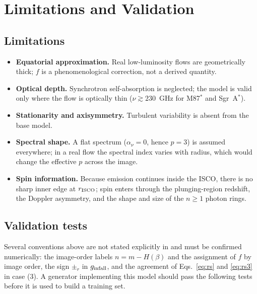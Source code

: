 \documentclass[11pt]{article}
\begin{document}
\section{Limitations and Validation}

\subsection{Limitations}

\begin{itemize}
  \item \textbf{Equatorial approximation.} Real low-luminosity flows are
        geometrically thick; $f$ is a phenomenological correction, not a
        derived quantity.
  \item \textbf{Optical depth.} Synchrotron self-absorption is neglected; the
        model is valid only where the flow is optically thin
        ($\nu \gtrsim 230$~GHz for M87$^*$ and Sgr~A$^*$).
  \item \textbf{Stationarity and axisymmetry.} Turbulent variability is
        absent from the base model.
  \item \textbf{Spectral shape.} A flat spectrum ($\alpha_\nu = 0$, hence
        $p = 3$) is assumed everywhere; in a real flow the spectral index
        varies with radius, which would change the effective $p$ across the
        image.
  \item \textbf{Spin information.} Because emission continues inside the ISCO,
        there is no sharp inner edge at $r_{\rm ISCO}$; spin enters through
        the plunging-region redshift, the Doppler asymmetry, and the shape and
        size of the $n \ge 1$ photon rings.
\end{itemize}

\subsection{Validation tests}

Several conventions above are not stated explicitly in \cite{GLM2020} and
must be confirmed numerically: the image-order labels $n = m - H(\beta)$ and
the assignment of $f$ by image order, the sign $\pm_r$ in $g_{\rm infall}$,
and the agreement of Eqs.~\eqref{eq:rs} and \eqref{eq:rs3} in case (3). A
generator implementing this model should pass the following tests before it
is used to build a training set.
\end{document}
